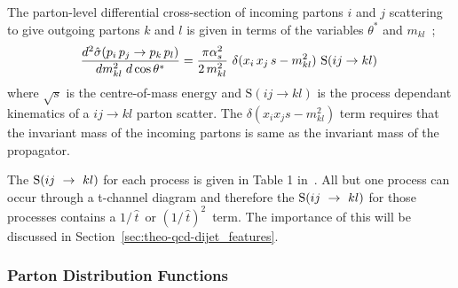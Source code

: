 \noindent
The parton-level differential cross-section of incoming partons $i$ and $j$ scattering to give
outgoing partons $k$ and $l$ is given in terms of the variables $\theta^*$ and $m_{kl}$~\cite{theo-qcd_xs};
\begin{equation}
  \frac{d^2 \hat{\sigma}(p_i\,p_j \to p_k\,p_l)}{dm_{kl}^{2}\hspace{1mm}d\cos{\theta^*}} = \frac{ \pi \alpha_s^2}{2 \,  m_{kl}^2}
  \ \delta(x_i\,x_j\,s - m_{kl}^{2})\ \text{S}(ij \to kl) \hspace{1mm}%
  \label{eq:theo-qcd_dijet_xs}
\end{equation}
where $\sqrt{s}$ is the centre-of-mass energy and $\text{S}(ij \to kl)$ is the process dependant kinematics of a $ij \to kl$ parton scatter.
The $\delta(x_i x_j s - m_{kl}^{2})$ term requires that the invariant mass of the incoming partons is same as the invariant mass of the propagator.

The $\text{S}\nobreak(ij~\to~kl)$ for each process is given in Table 1 in~\cite{theo-dijet_harris}.
All but one process can occur through a t-channel diagram and therefore the 
$\text{S}\nobreak(ij~\to~kl)$ for those processes contains a $1/\,\hat{t}\,$ or $(1/\,\hat{t})^2\,$ term.
The importance of this will be discussed in Section~\ref{sec:theo-qcd-dijet_features}.


\subsubsection{Parton Distribution Functions}
\label{sec:theo-qcd_pdf}

